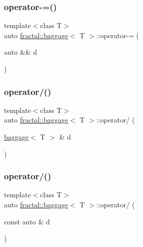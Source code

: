 \mbox{\label{classfractal_1_1baggage_a9d314a9b5b55481a6cb7b0aca2289276}} 
\subsubsection{\texorpdfstring{operator-\/=()}{operator-=()}\hspace{0.1cm}{\footnotesize\ttfamily [3/3]}}
{\footnotesize\ttfamily template$<$class T$>$ \\
auto \hyperlink{classfractal_1_1baggage}{fractal\+::baggage}$<$ T $>$\+::operator-\/= (\begin{DoxyParamCaption}\item[{auto \&\&}]{d }\end{DoxyParamCaption})\hspace{0.3cm}{\ttfamily [inline]}}

\mbox{\label{classfractal_1_1baggage_a0011426532f94259bb3a737c26e4f9a8}} 
\subsubsection{\texorpdfstring{operator/()}{operator/()}\hspace{0.1cm}{\footnotesize\ttfamily [1/3]}}
{\footnotesize\ttfamily template$<$class T$>$ \\
auto \hyperlink{classfractal_1_1baggage}{fractal\+::baggage}$<$ T $>$\+::operator/ (\begin{DoxyParamCaption}\item[{\hyperlink{classfractal_1_1baggage}{baggage}$<$ T $>$ \&}]{d }\end{DoxyParamCaption})\hspace{0.3cm}{\ttfamily [inline]}}

\mbox{\label{classfractal_1_1baggage_a335eab1ed6f72d8c77229d31e78aa2de}} 
\subsubsection{\texorpdfstring{operator/()}{operator/()}\hspace{0.1cm}{\footnotesize\ttfamily [2/3]}}
{\footnotesize\ttfamily template$<$class T$>$ \\
auto \hyperlink{classfractal_1_1baggage}{fractal\+::baggage}$<$ T $>$\+::operator/ (\begin{DoxyParamCaption}\item[{const auto \&}]{d }\end{DoxyParamCaption})\hspace{0.3cm}{\ttfamily [inline]}}

